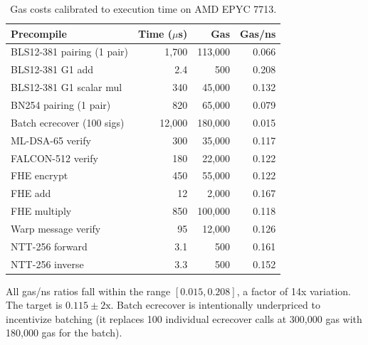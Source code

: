 \begin{table}[H]
\centering
\small
\begin{tabular}{@{}lrrr@{}}
\toprule
\textbf{Precompile} & \textbf{Time ($\mu$s)} & \textbf{Gas} & \textbf{Gas/ns} \\
\midrule
BLS12-381 pairing (1 pair) & 1,700 & 113,000 & 0.066 \\
BLS12-381 G1 add & 2.4 & 500 & 0.208 \\
BLS12-381 G1 scalar mul & 340 & 45,000 & 0.132 \\
BN254 pairing (1 pair) & 820 & 65,000 & 0.079 \\
Batch ecrecover (100 sigs) & 12,000 & 180,000 & 0.015 \\
ML-DSA-65 verify & 300 & 35,000 & 0.117 \\
FALCON-512 verify & 180 & 22,000 & 0.122 \\
FHE encrypt & 450 & 55,000 & 0.122 \\
FHE add & 12 & 2,000 & 0.167 \\
FHE multiply & 850 & 100,000 & 0.118 \\
Warp message verify & 95 & 12,000 & 0.126 \\
NTT-256 forward & 3.1 & 500 & 0.161 \\
NTT-256 inverse & 3.3 & 500 & 0.152 \\
\bottomrule
\end{tabular}
\caption{Gas costs calibrated to execution time on AMD EPYC 7713.}
\end{table}

All gas/ns ratios fall within the range $[0.015, 0.208]$, a factor of 14x variation.
The target is $0.115 \pm 2\text{x}$. Batch ecrecover is intentionally underpriced to
incentivize batching (it replaces 100 individual ecrecover calls at 300,000 gas with
180,000 gas for the batch).

